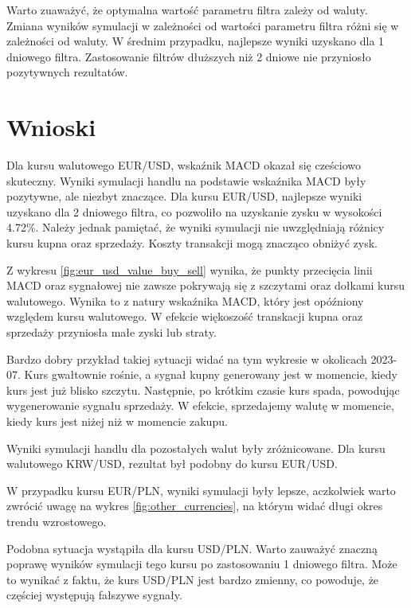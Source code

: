 \documentclass[12pt, a4paper]{article}
\begin{document}
Warto zuaważyć, że optymalna wartość parametru filtra zależy od waluty.
Zmiana wyników symulacji w zależności od wartości parametru filtra
różni się w zależności od waluty. W średnim przypadku, najlepsze wyniki uzyskano dla 1 dniowego filtra.
Zastosowanie filtrów dłuższych niż 2 dniowe nie przyniosło pozytywnych rezultatów.

\pagebreak






\section{Wnioski}
Dla kursu walutowego EUR/USD, wskaźnik MACD okazał się cześciowo skuteczny.
Wyniki symulacji handlu na podstawie wskaźnika MACD były pozytywne, ale niezbyt znaczące.
Dla kursu EUR/USD, najlepsze wyniki uzyskano dla 2 dniowego filtra,
co pozwoliło na uzyskanie zysku w wysokości 4.72\%. Należy jednak pamiętać, że wyniki symulacji
nie uwzględniają różnicy kursu kupna oraz sprzedaży. Koszty transakcji mogą znacząco obniżyć zysk.

Z wykresu \ref{fig:eur_usd_value_buy_sell} wynika, że punkty przecięcia linii MACD oraz sygnałowej
nie zawsze pokrywają się z szczytami oraz dołkami kursu walutowego. Wynika to z natury wskaźnika MACD,
który jest opóźniony względem kursu walutowego. W efekcie więkoszość transkacji kupna oraz sprzedaży
przyniosła małe zyski lub straty.

Bardzo dobry przykład takiej sytuacji widać na tym wykresie w okolicach 2023-07. Kurs
gwałtownie rośnie, a sygnał kupny generowany jest w momencie, kiedy kurs jest już blisko szczytu.
Następnie, po krótkim czasie kurs spada, powodując wygenerowanie sygnału sprzedaży.
W efekcie, sprzedajemy walutę w momencie, kiedy kurs jest niżej niż w momencie zakupu.

Wyniki symulacji handlu dla pozostałych walut były zróżnicowane. Dla kursu walutowego KRW/USD,
rezultat był podobny do kursu EUR/USD.

W przypadku kursu EUR/PLN, wyniki symulacji były lepsze, aczkolwiek warto zwrócić uwagę na
wykres \ref{fig:other_currencies}, na którym widać długi okres trendu wzrostowego.

Podobna sytuacja wystąpiła dla kursu USD/PLN. Warto zauważyć znaczną poprawę wyników symulacji
tego kursu po zastosowaniu 1 dniowego filtra. Może to wynikać z faktu, że kurs USD/PLN jest
bardzo zmienny, co powoduje, że częściej występują fałszywe sygnały.
\end{document}
